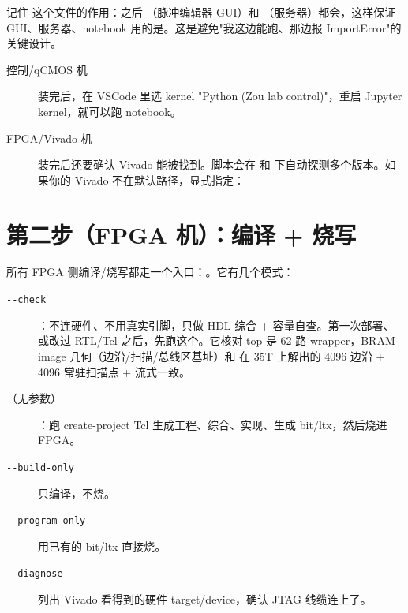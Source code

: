 \documentclass[11pt,oneside,openany]{book}
\begin{document}
记住  这个文件的作用：之后 （脉冲编辑器 GUI）和 （服务器）都会，这样保证 GUI、服务器、notebook 用的是。这是避免"我这边能跑、那边报 ImportError"的关键设计。

\begin{description}
\item[控制/qCMOS 机] 装完后，在 VSCode 里选 kernel "Python (Zou lab control)"，重启 Jupyter kernel，就可以跑 notebook。
\item[FPGA/Vivado 机] 装完后还要确认 Vivado 能被找到。脚本会在  和  下自动探测多个版本。如果你的 Vivado 不在默认路径，显式指定：
\end{description}


\section{第二步（FPGA 机）：编译 + 烧写}

所有 FPGA 侧编译/烧写都走一个入口：。它有几个模式：

\begin{description}
\item[\texttt{-{}-check}] ：不连硬件、不用真实引脚，只做 HDL 综合 + 容量自查。第一次部署、或改过 RTL/Tcl 之后，先跑这个。它核对 top 是 62 路 wrapper，BRAM image 几何（边沿/扫描/总线区基址）和  在 35T 上解出的 4096 边沿 + 4096 常驻扫描点 + 流式一致。
\item[（无参数）] ：跑 create-project Tcl 生成工程、综合、实现、生成 bit/ltx，然后烧进 FPGA。
\item[\texttt{-{}-build-only}] 只编译，不烧。
\item[\texttt{-{}-program-only}] 用已有的 bit/ltx 直接烧。
\item[\texttt{-{}-diagnose}] 列出 Vivado 看得到的硬件 target/device，确认 JTAG 线缆连上了。
\end{description}
\end{document}
